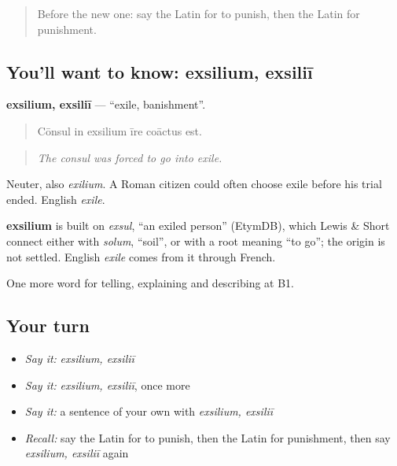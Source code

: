 \begin{quote}
Before the new one: say the Latin for to punish, then the Latin for punishment.
\end{quote}

\subsection*{You'll want to know: exsilium, exsiliī}
\textbf{exsilium, exsiliī} — \textquotedblleft{}exile, banishment\textquotedblright{}.

\begin{quote}
Cōnsul in exsilium īre coāctus est.
\end{quote}

\begin{quote}
\emph{The consul was forced to go into exile.}
\end{quote}

Neuter, also \emph{exilium}. A Roman citizen could often choose exile before his trial ended. English \emph{exile}.

\begin{cousinweb}
\textbf{exsilium} is built on \emph{exsul}, \textquotedblleft{}an exiled person\textquotedblright{} (EtymDB), which Lewis \& Short connect either with \emph{solum}, \textquotedblleft{}soil\textquotedblright{}, or with a root meaning \textquotedblleft{}to go\textquotedblright{}; the origin is not settled. English \emph{exile} comes from it through French.
\end{cousinweb}

\begin{grammarlens}[title={What you've built}]
One more word for telling, explaining and describing at B1.
\end{grammarlens}

\subsection*{Your turn}
\begin{itemize}
\raggedright
  \item \emph{Say it:} \emph{exsilium, exsiliī}
  \item \emph{Say it:} \emph{exsilium, exsiliī}, once more
  \item \emph{Say it:} a sentence of your own with \emph{exsilium, exsiliī}
  \item \emph{Recall:} say the Latin for to punish, then the Latin for punishment, then say \emph{exsilium, exsiliī} again
\end{itemize}

